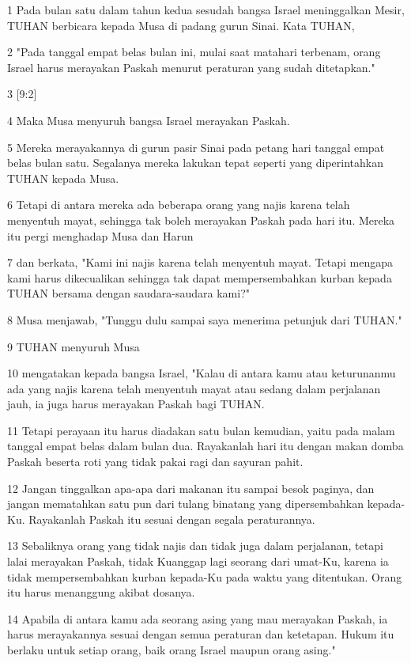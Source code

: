 \par 1 Pada bulan satu dalam tahun kedua sesudah bangsa Israel meninggalkan Mesir, TUHAN berbicara kepada Musa di padang gurun Sinai. Kata TUHAN,
\par 2 "Pada tanggal empat belas bulan ini, mulai saat matahari terbenam, orang Israel harus merayakan Paskah menurut peraturan yang sudah ditetapkan."
\par 3 [9:2]
\par 4 Maka Musa menyuruh bangsa Israel merayakan Paskah.
\par 5 Mereka merayakannya di gurun pasir Sinai pada petang hari tanggal empat belas bulan satu. Segalanya mereka lakukan tepat seperti yang diperintahkan TUHAN kepada Musa.
\par 6 Tetapi di antara mereka ada beberapa orang yang najis karena telah menyentuh mayat, sehingga tak boleh merayakan Paskah pada hari itu. Mereka itu pergi menghadap Musa dan Harun
\par 7 dan berkata, "Kami ini najis karena telah menyentuh mayat. Tetapi mengapa kami harus dikecualikan sehingga tak dapat mempersembahkan kurban kepada TUHAN bersama dengan saudara-saudara kami?"
\par 8 Musa menjawab, "Tunggu dulu sampai saya menerima petunjuk dari TUHAN."
\par 9 TUHAN menyuruh Musa
\par 10 mengatakan kepada bangsa Israel, "Kalau di antara kamu atau keturunanmu ada yang najis karena telah menyentuh mayat atau sedang dalam perjalanan jauh, ia juga harus merayakan Paskah bagi TUHAN.
\par 11 Tetapi perayaan itu harus diadakan satu bulan kemudian, yaitu pada malam tanggal empat belas dalam bulan dua. Rayakanlah hari itu dengan makan domba Paskah beserta roti yang tidak pakai ragi dan sayuran pahit.
\par 12 Jangan tinggalkan apa-apa dari makanan itu sampai besok paginya, dan jangan mematahkan satu pun dari tulang binatang yang dipersembahkan kepada-Ku. Rayakanlah Paskah itu sesuai dengan segala peraturannya.
\par 13 Sebaliknya orang yang tidak najis dan tidak juga dalam perjalanan, tetapi lalai merayakan Paskah, tidak Kuanggap lagi seorang dari umat-Ku, karena ia tidak mempersembahkan kurban kepada-Ku pada waktu yang ditentukan. Orang itu harus menanggung akibat dosanya.
\par 14 Apabila di antara kamu ada seorang asing yang mau merayakan Paskah, ia harus merayakannya sesuai dengan semua peraturan dan ketetapan. Hukum itu berlaku untuk setiap orang, baik orang Israel maupun orang asing."
